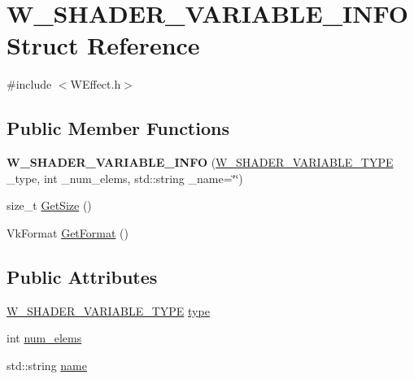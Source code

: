 \hypertarget{struct_w___s_h_a_d_e_r___v_a_r_i_a_b_l_e___i_n_f_o}{}\section{W\+\_\+\+S\+H\+A\+D\+E\+R\+\_\+\+V\+A\+R\+I\+A\+B\+L\+E\+\_\+\+I\+N\+FO Struct Reference}
\label{struct_w___s_h_a_d_e_r___v_a_r_i_a_b_l_e___i_n_f_o}


{\ttfamily \#include $<$W\+Effect.\+h$>$}

\subsection*{Public Member Functions}
\begin{DoxyCompactItemize}
\item 
{\bfseries W\+\_\+\+S\+H\+A\+D\+E\+R\+\_\+\+V\+A\+R\+I\+A\+B\+L\+E\+\_\+\+I\+N\+FO} (\hyperlink{group__engineclass_gaeca2b79f62ba669ae9c5dbc516b66522}{W\+\_\+\+S\+H\+A\+D\+E\+R\+\_\+\+V\+A\+R\+I\+A\+B\+L\+E\+\_\+\+T\+Y\+PE} \+\_\+type, int \+\_\+num\+\_\+elems, std\+::string \+\_\+name=\char`\"{}\char`\"{})\hypertarget{struct_w___s_h_a_d_e_r___v_a_r_i_a_b_l_e___i_n_f_o_a7146ac62a2911ba861d9661debb7fac5}{}\label{struct_w___s_h_a_d_e_r___v_a_r_i_a_b_l_e___i_n_f_o_a7146ac62a2911ba861d9661debb7fac5}

\item 
size\+\_\+t \hyperlink{struct_w___s_h_a_d_e_r___v_a_r_i_a_b_l_e___i_n_f_o_aa18e0f7e7d80c98ddcbaeaa55649fc22}{Get\+Size} ()
\item 
Vk\+Format \hyperlink{struct_w___s_h_a_d_e_r___v_a_r_i_a_b_l_e___i_n_f_o_ab9e7bb852fada1b45ec4af82d30cb484}{Get\+Format} ()
\end{DoxyCompactItemize}
\subsection*{Public Attributes}
\begin{DoxyCompactItemize}
\item 
\hyperlink{group__engineclass_gaeca2b79f62ba669ae9c5dbc516b66522}{W\+\_\+\+S\+H\+A\+D\+E\+R\+\_\+\+V\+A\+R\+I\+A\+B\+L\+E\+\_\+\+T\+Y\+PE} \hyperlink{struct_w___s_h_a_d_e_r___v_a_r_i_a_b_l_e___i_n_f_o_a8dd6afc8a043c57343a7e401dffaaa0b}{type}
\item 
int \hyperlink{struct_w___s_h_a_d_e_r___v_a_r_i_a_b_l_e___i_n_f_o_a76488ce65cd829ddc892ebd86560b889}{num\+\_\+elems}
\item 
std\+::string \hyperlink{struct_w___s_h_a_d_e_r___v_a_r_i_a_b_l_e___i_n_f_o_a6c7ea051bec0e855ef7531ac619eacc4}{name}
\end{DoxyCompactItemize}


